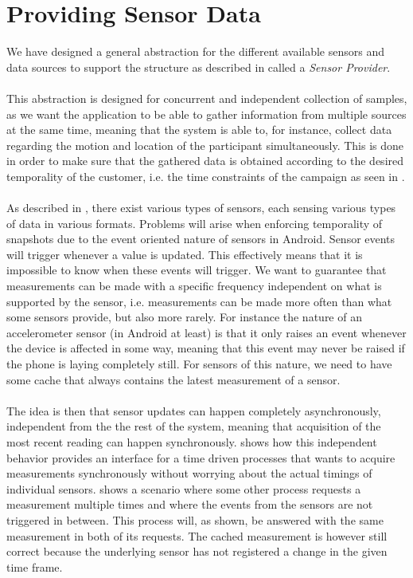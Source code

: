 
\section{Providing Sensor Data}
\label{sec:providing_sensor_data}

We have designed a general abstraction for the different available sensors and data sources to support the structure as described in  called a \emph{Sensor Provider}. 
\\\\
This abstraction is designed for concurrent and independent collection of samples, as we want the application to be able to gather information from multiple sources at the same time, meaning that the system is able to, for instance, collect data regarding the motion and location of the participant simultaneously. This is done in order to make sure that the gathered data is obtained according to the desired temporality of the customer, i.e. the time constraints of the campaign as seen in .
\\\\
As described in , there exist various types of sensors, each sensing various types of data in various formats. Problems will arise when enforcing temporality of snapshots due to the event oriented nature of sensors in Android. Sensor events will trigger whenever a value is updated. This effectively means that it is impossible to know when these events will trigger. We want to guarantee that measurements can be made with a specific frequency independent on what is supported by the sensor, i.e. measurements can be made more often than what some sensors provide, but also more rarely. For instance the nature of an accelerometer sensor (in Android at least) is that it only raises an event whenever the device is affected in some way, meaning that this event may never be raised if the phone is laying completely still. For sensors of this nature, we need to have some cache that always contains the latest measurement of a sensor. 
\\\\
The idea is then that sensor updates can happen completely asynchronously, independent from the the rest of the system, meaning that acquisition of the most recent reading can happen synchronously.  shows how this independent behavior provides an interface for a time driven processes that wants to acquire measurements synchronously without worrying about the actual timings of individual sensors.  shows a scenario where some other process requests a measurement multiple times and where the events from the sensors are not triggered in between. This process will, as shown, be answered with the same measurement in both of its requests. The cached measurement is however still correct because the underlying sensor has not registered a change in the given time frame. 
